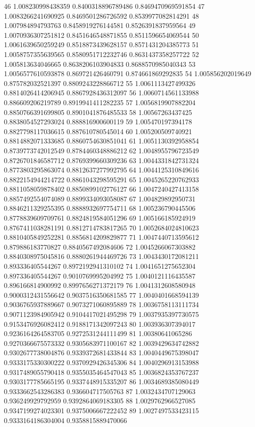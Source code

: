 46	1.008230998438359	0.8400318896789486	0.8469470969591854
47	1.0083266241690925	0.8469501286726592	0.8539977082814291
48	1.007984894793763	0.8458919276144581	0.8526391837959564
49	1.0070936307251812	0.8451646548871855	0.8511596654069544
50	1.0061639650259249	0.8518873439628157	0.8571431204385773
51	1.0058757355639565	0.8580951712232746	0.8631437358257722
52	1.005813634046665	0.8638206103904833	0.8688570985040343
53	1.0056577610593878	0.869721426460791	0.874661869292835
54	1.005856202019649	0.875782032521397	0.8809243228866712
55	1.0061113427499326	0.8814026414206945	0.8867928436312097
56	1.0060714561133988	0.886609206219789	0.8919941411282235
57	1.0056819907882204	0.8850766391699805	0.8901041876485533
58	1.00567263437425	0.8838054527293024	0.888816900600119
59	1.005470197394178	0.8827798117036615	0.887610780545014
60	1.005200509740921	0.8814882071333685	0.8860754630851041
61	1.0051130392958854	0.8739773742012549	0.8784460348886212
62	1.0048955796723549	0.8726701846587712	0.8769399660309236
63	1.0044331842731324	0.8773803295863074	0.8812637277992795
64	1.0044125310849616	0.8822154944214722	0.8861043298595291
65	1.0045265220762933	0.8811058059878402	0.8850899102776127
66	1.0047240427413158	0.8857492554074089	0.8899334093058087
67	1.004829892950731	0.8846211329255395	0.8888932697754711
68	1.005236790445506	0.8778839609709761	0.8824819584051296
69	1.005166185924919	0.8767411038281191	0.8812714783817265
70	1.0052684024810623	0.8810405849252281	0.8856814209829877
71	1.0047440713595612	0.879886183770827	0.8840567492084606
72	1.0045266067303882	0.8840308975045816	0.8880261944469726
73	1.0043430172081211	0.893336405544267	0.8972192941310102
74	1.0041651275652304	0.897336405544267	0.9010769995204992
75	1.0040121116435587	0.896166814900992	0.8997656271372179
76	1.0041312608580948	0.9000312431556642	0.9037516350681585
77	1.0040401668594139	0.9036765937889667	0.9073271060895889
78	1.0036758113111734	0.9071123984905942	0.9104417021495298
79	1.0037935397730575	0.9153476926082412	0.9188171342097243
80	1.003936307394017	0.9236164264583705	0.9272531244111499
81	1.00380641065286	0.9270366675573332	0.9305683971100167
82	1.0039429634742882	0.9302677738004876	0.9339372681433844
83	1.0040449675398047	0.9333175330300222	0.9370929426345306
84	1.0040296913153988	0.9317489055790418	0.9355035464547043
85	1.0036824353767237	0.9303177785665195	0.9337448915335207
86	1.0034689385080449	0.9333662543286383	0.936604717505763
87	1.0032434707129063	0.936249929792959	0.9392864069183305
88	1.0029762966527085	0.9347199274023301	0.9375006667222452
89	1.0027497533423115	0.9333164186304004	0.9358815889470066
